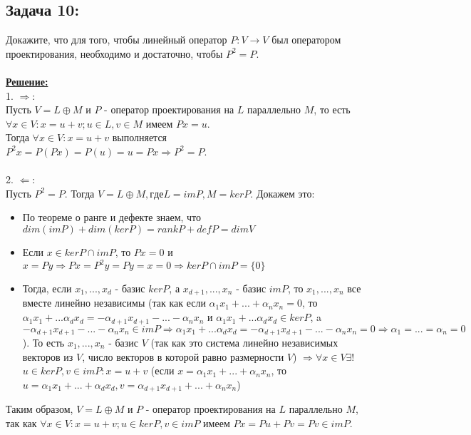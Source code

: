 \documentclass[a4paper,12pt,titlepage,final]{article}
\begin{document}
\subsection*{Задача 10:}
\noindent Докажите, что для того, чтобы линейный оператор $P: V \rightarrow V$ был оператором проектирования,
необходимо и достаточно, чтобы $P^2 = P$. \\ \\
\textbf{\underline{Решение:}} \\
1. $\Rightarrow:$ \\
Пусть $V = L \oplus M$ и $P$ - оператор проектирования на $L$ параллельно $M$, то есть
$\forall x \in V: x = u + v; u \in L, v \in M$ имеем $Px = u$. \\
Тогда $\forall x \in V: x = u + v$ выполняется $P^2x = P(Px) = P(u) = u = Px \Rightarrow P^2 = P$. \\ \\
2. $\Leftarrow:$ \\
Пусть $P^2 = P$. Тогда $V = L \oplus M, где L = imP, M = kerP$. Докажем это: \\
\begin {itemize}
\item По теореме о ранге и дефекте знаем, что $dim(imP) + dim(kerP) = rankP + defP = dim V$ \\
\item Если $x \in kerP \cap imP$, то $Px = 0$ и $x = Py \Rightarrow Px = P^2y = Py = x = 0 \Rightarrow kerP \cap imP = \{0\}$\\
\item Тогда, если $x_1, ... , x_d$ - базис $kerP$, а $x_{d+1}, ... , x_n$ - базис $imP$, то
$x_1, ... , x_n$ все вместе линейно независимы (так как если $\alpha_1 x_1 + ... + \alpha_n x_n = 0$, то
$\alpha_1 x_1 + ... \alpha_d x_d = -\alpha_{d+1} x_{d+1} - ... - \alpha_n x_n$ и
$\alpha_1 x_1 + ... \alpha_d x_d \in kerP$, a $-\alpha_{d+1} x_{d+1} - ... - \alpha_n x_n \in imP
\Rightarrow \alpha_1 x_1 + ... \alpha_d x_d = -\alpha_{d+1} x_{d+1} - ... - \alpha_n x_n = 0
\Rightarrow \alpha_1 = ... = \alpha_n  = 0$). То есть $x_1, ... , x_n$ - базис $V$ (так как
это система линейно независимых векторов из $V$, число векторов в которой равно размерности $V$) $\Rightarrow
\forall x \in V \exists !$ $u \in kerP, v \in im P: x = u + v$ (если $x = \alpha_1 x_1 + ... + \alpha_n x_n$, то
$u = \alpha_1 x_1 + ... + \alpha_d x_d, v = \alpha_{d+1} x_{d+1} + ... + \alpha_n x_n$)\\
\end {itemize}
Таким образом, $V = L \oplus M$ и $P$ - оператор проектирования на $L$ параллельно $M$, так как
$\forall x \in V: x = u + v; u \in kerP, v \in im P$ имеем $Px = Pu + Pv = Pv \in imP$. \\ \\ \\
\end{document}
